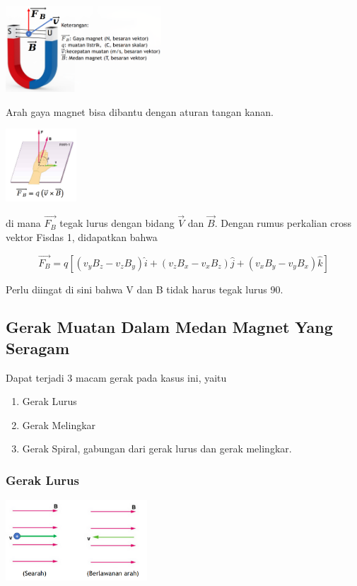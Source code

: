 \documentclass[twocolumn, 11pt]{article}%
\begin{document}
\begin{center}
    \includegraphics[width=220px]{5.png}
\end{center}

Arah gaya magnet bisa dibantu dengan aturan tangan kanan.
\begin{center}
    \includegraphics[width=100px]{6.png}
\end{center}

di mana $\overrightarrow{F_B}$ tegak lurus dengan bidang $\vec V$ dan
$\vec B$. Dengan rumus perkalian cross vektor Fisdas 1, didapatkan bahwa 

\[ \overrightarrow{F_B} = q[(v_y B_z - v_z B_y)\hat i + (v_z B_x - v_x
B_z)\hat j + (v_x B_y - v_y B_x)\hat k] \]

Perlu diingat di sini bahwa V dan B tidak harus tegak lurus 90\textdegree.

\subsection{Gerak Muatan Dalam Medan Magnet Yang Seragam}%
Dapat terjadi 3 macam gerak pada kasus ini, yaitu
\begin{enumerate}
    \item Gerak Lurus
    \item Gerak Melingkar
    \item Gerak Spiral, gabungan dari gerak lurus dan gerak melingkar.
\end{enumerate}

\subsubsection{Gerak Lurus}%
\begin{center}
    \includegraphics[width=200px]{7.png}
\end{center}
\end{document}
